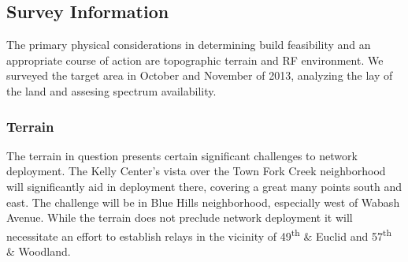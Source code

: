 \subsection{Survey Information}
The primary physical considerations in determining build feasibility and an
appropriate course of action are topographic terrain and RF environment. We
surveyed the target area in October and November of 2013, analyzing the lay of the land
and assesing spectrum availability. \par
\subsubsection{Terrain}
The terrain in question presents certain significant challenges to network
deployment. The Kelly Center's vista over the Town Fork Creek neighborhood
will significantly aid in deployment there, covering a great many points
south and east. The challenge will be in Blue Hills neighborhood, especially 
west of Wabash Avenue. While the terrain does not preclude network deployment
it will necessitate an effort to establish relays in the vicinity of 49\textsuperscript{th}
\& Euclid and 57\textsuperscript{th} \& Woodland.
\begin{center}
\end{center}
